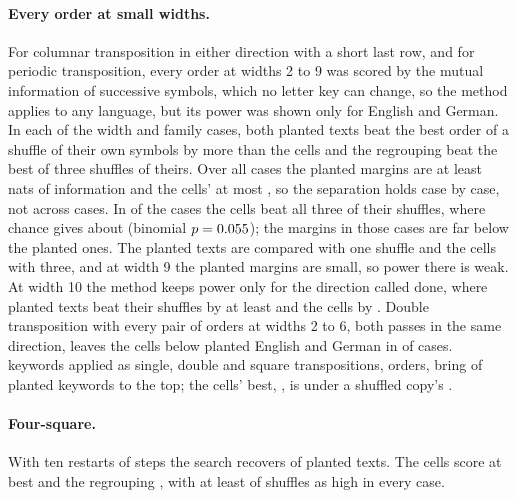 \documentclass[11pt]{article}
\theoremstyle{definition}
\begin{document}
\paragraph{Every order at small widths.} For columnar transposition in either direction with a short last row, and for periodic transposition, every order at widths 2 to 9 was scored by the mutual information of successive symbols, which no letter key can change, so the method applies to any language, but its power was shown only for English and German. In each of the \exhaustiveCases{} width and family cases, both planted texts beat the best order of a shuffle of their own symbols by more than the cells and the regrouping beat the best of three shuffles of theirs. Over all cases the planted margins are at least \exhaustivePlantedSmallest{} nats of information and the cells' at most \exhaustiveCellsLargest{}, so the separation holds case by case, not across cases. In \exAboveAll{} of the \exCasesAll{} cases the cells beat all three of their shuffles, where chance gives about \exAboveChance{} (binomial $p = 0.055{}$); the margins in those cases are far below the planted ones. The planted texts are compared with one shuffle and the cells with three, and at width 9 the planted margins are small, so power there is weak. At width 10 the method keeps power only for the direction called done, where planted texts beat their shuffles by at least \tenDonePlantedLow{} and the cells by \tenDoneCells{}. Double transposition with every pair of orders at widths 2 to 6, both passes in the same direction, leaves the cells below planted English and German in \doubleBelow{} of \doubleCases{} cases. \keywordCount{} keywords applied as single, double and square transpositions, \keywordOrders{} orders, bring \keywordPlantsFirst{} of \keywordPlants{} planted keywords to the top; the cells' best, \keywordCells{}, is under a shuffled copy's \keywordNullHigh{}.

\paragraph{Four-square.} With ten restarts of \fsSteps{} steps the search recovers \fsRecovered{} of \fsPlanted{} planted texts. The cells score at best \fsCellsBest{} and the regrouping \fsRegroupedBest{}, with at least \fsShufflesMin{} of \fsShuffles{} shuffles as high in every case.
\end{document}
